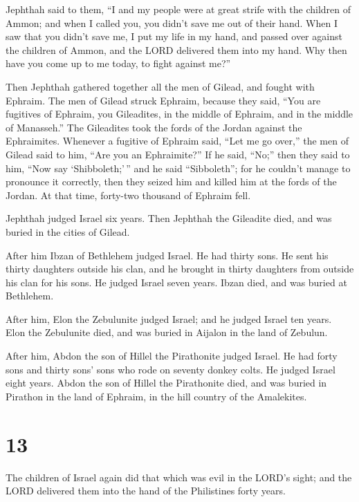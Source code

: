  Jephthah said to them, ``I and my people were at great
strife with the children of Ammon; and when I called you, you didn't
save me out of their hand.  When I saw that you didn't save
me, I put my life in my hand, and passed over against the children of
Ammon, and the LORD delivered them into my hand. Why then have you come
up to me today, to fight against me?''

 Then Jephthah gathered together all the men of Gilead, and
fought with Ephraim. The men of Gilead struck Ephraim, because they
said, ``You are fugitives of Ephraim, you Gileadites, in the middle of
Ephraim, and in the middle of Manasseh.''  The Gileadites
took the fords of the Jordan against the Ephraimites. Whenever a
fugitive of Ephraim said, ``Let me go over,'' the men of Gilead said to
him, ``Are you an Ephraimite?'' If he said, ``No;''  then
they said to him, ``Now say `Shibboleth;'\,'' and he said ``Sibboleth'';
for he couldn't manage to pronounce it correctly, then they seized him
and killed him at the fords of the Jordan. At that time, forty-two
thousand of Ephraim fell.

 Jephthah judged Israel six years. Then Jephthah the
Gileadite died, and was buried in the cities of Gilead.

 After him Ibzan of Bethlehem judged Israel.  He
had thirty sons. He sent his thirty daughters outside his clan, and he
brought in thirty daughters from outside his clan for his sons. He
judged Israel seven years.  Ibzan died, and was buried at
Bethlehem.

 After him, Elon the Zebulunite judged Israel; and he
judged Israel ten years.  Elon the Zebulunite died, and was
buried in Aijalon in the land of Zebulun.

 After him, Abdon the son of Hillel the Pirathonite judged
Israel.  He had forty sons and thirty sons' sons who rode
on seventy donkey colts. He judged Israel eight years. 
Abdon the son of Hillel the Pirathonite died, and was buried in Pirathon
in the land of Ephraim, in the hill country of the Amalekites.

\hypertarget{section-12}{%
\section{13}\label{section-12}}

 The children of Israel again did that which was evil in the
LORD's sight; and the LORD delivered them into the hand of the
Philistines forty years.

